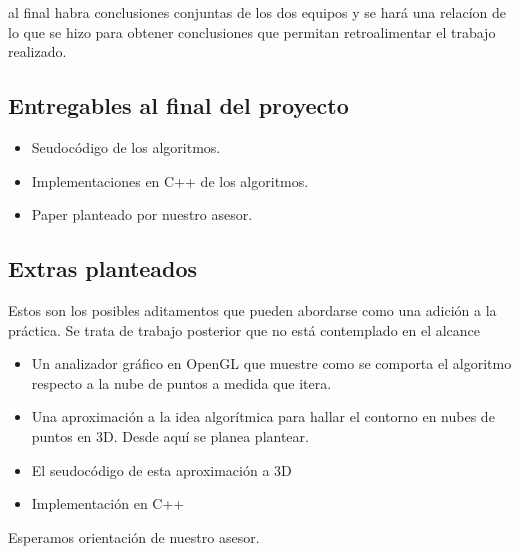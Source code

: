 \documentclass[final, 12pt letterpaper]{article}
\begin{document}
al final habra conclusiones conjuntas de los dos equipos y se hará una relacíon de lo que se hizo para obtener conclusiones que permitan retroalimentar el trabajo realizado.

\subsection{Entregables al final del proyecto}
\begin{itemize}
\item Seudocódigo de los algoritmos.
\item Implementaciones en C++ de los algoritmos.
\item Paper planteado por nuestro asesor.
\end{itemize}
\subsection{Extras planteados}
Estos son los posibles aditamentos que pueden abordarse como una adición a la práctica. Se trata de trabajo posterior que no está contemplado en el alcance
\begin{itemize}
\item Un analizador gráfico en OpenGL que muestre como se comporta el algoritmo respecto a la nube de puntos a medida que itera.
\item Una aproximación a la idea algorítmica para hallar el contorno en nubes de puntos en 3D. Desde aquí se planea plantear.
\item El seudocódigo de esta aproximación a 3D
\item Implementación en C++
\end{itemize}
Esperamos orientación de nuestro asesor.
\end{document}
